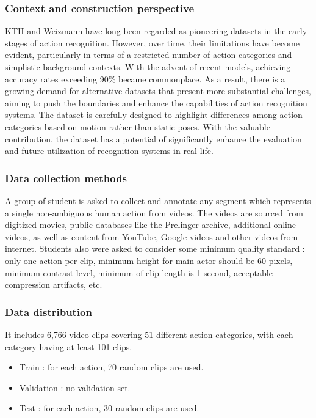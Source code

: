\documentclass[10pt,onecolumn,letterpaper]{article}
\begin{document}
\subsubsection{\textbf{Context and construction perspective}}
KTH \cite{KTH} and Weizmann \cite{Weizmann} have long been regarded as
pioneering datasets in the early stages of action recognition. However, over
time, their limitations have become evident, particularly in terms of a
restricted number of action categories and simplistic background contexts. With
the advent of recent models, achieving accuracy rates exceeding 90\% became
commonplace. As a result, there is a growing demand for alternative datasets
that present more substantial challenges, aiming to push the boundaries and
enhance the capabilities of action recognition systems. The dataset is carefully
designed to highlight differences among action categories based on motion rather
than static poses. With the valuable contribution, the dataset has a potential
of significantly enhance the evaluation and future utilization of recognition
systems in real life. 

\subsubsection{\textbf{Data collection methods}}
A group of student is asked to collect and annotate any segment which represents
a single non-ambiguous human action from videos. The videos are sourced from
digitized movies, public databases like the Prelinger archive, additional online
videos, as well as content from YouTube, Google videos and other videos from
internet. Students also were asked to consider some minimum quality standard : 
only one action per clip, minimum height for main actor should be 60 pixels,
minimum contrast level, minimum of clip length is 1 second, acceptable
compression artifacts, etc. 

\subsubsection{\textbf{Data distribution}} 
It includes 6,766 video clips covering 51 different action categories, with each
category having at least 101 clips. 
\begin{itemize}
	\item Train : for each action, 70 random clips are used.
	\item Validation : no validation set.
	\item Test : for each action, 30 random clips are used. 
\end{itemize}
\end{document}
